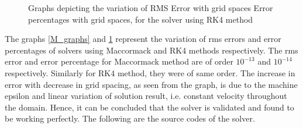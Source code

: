 \documentclass[a4paper]{report}
\begin{document}
	\begin{figure}[htb!]
		
		\caption{Graphs depicting the variation of  RMS Error with grid spaces  Error percentages with grid spaces, for the solver using RK4 method}
		\label{R_graphs}
	\end{figure}
	
	\newpage
	The graphs \cref{M_graphs} and \cref{R_graphs} represent the variation of rms errors and error percentages of solvers using Maccormack and RK4 methods respectively. The rms error and error percentage for Maccormack method are of order $10^{-13}$ and $10^{-14}$ respectively. Similarly for RK4 method, they were of same order. The increase in error with decrease in grid spacing, as seen from the graph, is due to the machine epsilon and linear variation of solution result, i.e. constant velocity throughout the domain. Hence, it can be concluded that the solver is validated and found to be working perfectly. The following are the source codes of the solver.
	
\end{document}
